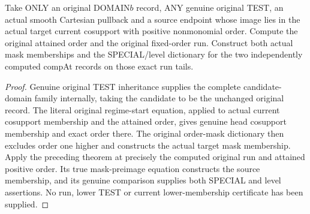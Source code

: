 \begin{theorem}
\label{hir:original-positive-run-companion-special-level}
\leanok
Take ONLY an original DOMAIN$b$ record, ANY genuine original TEST, an actual
smooth Cartesian pullback and a source endpoint whose image lies in the
actual target current cosupport with positive nonmonomial order. Compute the
original attained order and the original fixed-order run. Construct both
actual mask memberships and the SPECIAL/level dictionary for the two
independently computed compAt records on those exact run tails.
\end{theorem}
\begin{proof}
Genuine original TEST inheritance supplies the complete candidate-domain
family internally, taking the candidate to be the unchanged original record.
The literal original regime-start equation, applied to actual current
cosupport membership and the attained order, gives genuine head cosupport
membership and exact order there. The original order-mask dictionary then
excludes order one higher and constructs the actual target mask membership.
Apply the preceding theorem at precisely the computed original run and
attained positive order. Its true mask-preimage equation constructs the
source membership, and its genuine comparison supplies both SPECIAL and
level assertions. No run, lower TEST or current lower-membership certificate
has been supplied.
\end{proof}

